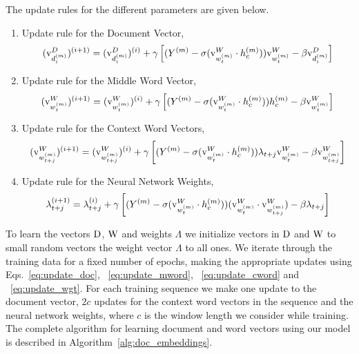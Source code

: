 The update rules for the different parameters are given below.
\begin{enumerate}
\item 
Update rule for the Document Vector,
\begin{equation}
\label{eq:update_doc}
(\mathrm{v}^{D}_{d^{(m)}_{i}})^{(i+1)} = (\mathrm{v}^{D}_{d^{(m)}_{i}})^{(i)} + \gamma \left[ (Y^{(m)} - \sigma(\mathrm{v}^{W}_{w^{(m)}_{t}} \cdot h^{(m)}_{c}) )\mathrm{v}^{W}_{w^{(m)}_{t}} - \beta\mathrm{v}^{D}_{d^{(m)}_{i}} \right]
\end{equation}
\item 
Update rule for the Middle Word Vector, 
\begin{equation}
\label{eq:update_mword}
(\mathrm{v}^{W}_{w^{(m)}_{t}})^{(i+1)} = (\mathrm{v}^{W}_{w^{(m)}_{t}})^{(i)} + \gamma \left[ (Y^{(m)} - \sigma(\mathrm{v}^{W}_{w^{(m)}_{t}} \cdot h^{(m)}_{c})) h^{(m)}_{c} - \beta\mathrm{v}^{W}_{w^{(m)}_{t}} \right]
\end{equation}
\item 
Update rule for the Context Word Vectors,
\begin{equation}
\label{eq:update_cword}
(\mathrm{v}^{W}_{w^{(m)}_{t+j}})^{(i+1)} = (\mathrm{v}^{W}_{w^{(m)}_{t+j}})^{(i)} + \gamma \left[(Y^{(m)} - \sigma(\mathrm{v}^{W}_{w^{(m)}_{t}} \cdot h^{(m)}_{c}))\lambda_{t+j} \mathrm{v}^{W}_{w^{(m)}_{t}} - \beta\mathrm{v}^{W}_{w^{(m)}_{t+j}} \right]
\end{equation}
\item 
Update rule for the Neural Network Weights,
\begin{equation}
\label{eq:update_wgt}
\lambda_{t+j}^{(i+1)} = \lambda_{t+j}^{(i)} + \gamma \left[ (Y^{(m)} - \sigma(\mathrm{v}^{W}_{w^{(m)}_{t}} \cdot h^{(m)}_{c}))(\mathrm{v}^{W}_{w^{(m)}_{t}} \cdot \mathrm{v}^{W}_{w^{(m)}_{t+j}}) -\beta\lambda_{t+j} \right]
\end{equation}
\end{enumerate}
To learn the vectors $\mathrm{D}$, $\mathrm{W}$ and weights $\Lambda$ we initialize vectors in $\mathrm{D}$ and $\mathrm{W}$ to small random vectors the weight vector $\Lambda$ to all ones. We iterate through the training data for a fixed number of epochs, making the appropriate updates using Eqs.~\ref{eq:update_doc}, ~\ref{eq:update_mword}, ~\ref{eq:update_cword} and ~\ref{eq:update_wgt}. For each training sequence we make one update to the document vector, $2c$ updates for the context word vectors in the sequence and the neural network weights, where $c$ is the window length we consider while training. The complete algorithm for learning document and word vectors using our model is described in Algorithm~\ref{alg:doc_embeddings}.

